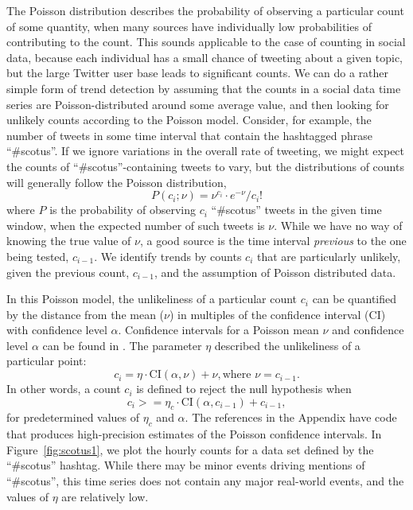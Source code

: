 \documentclass{article}
\begin{document}
The Poisson distribution describes the probability of observing a particular
count of some quantity, when many sources have individually low probabilities
of contributing to the count. This sounds applicable to the case of counting in
social data, because each individual has a small chance of tweeting about a
given topic, but the large Twitter user base leads to significant counts. We
can do a rather simple form of trend detection by assuming that the counts in a
social data time series are Poisson-distributed around some average value, and
then looking for unlikely counts according to the Poisson model. Consider, for example,
the number of tweets in some time interval that contain the hashtagged phrase ``\#scotus''.
If we ignore variations in the overall rate of tweeting, we might expect the
counts of ``\#scotus''-containing tweets to vary, but the distributions of counts
will generally follow the Poisson distribution,
\begin{equation}
    P(c_i;\nu) = \nu^{c_i}\cdot e^{-\nu} / c_i!
\end{equation}
where $P$ is the probability of observing $c_i$ ``\#scotus'' tweets in the given time
window, when the expected number of such tweets is $\nu$. While we have no way of
knowing the true value of $\nu$, a good source is the time interval \textit{previous} to the
one being tested, $c_{i-1}$. We identify trends by counts $c_i$ that are particularly
unlikely, given the previous count, $c_{i-1}$, and the assumption of Poisson
distributed data. 

In this Poisson model, the unlikeliness of a particular count $c_i$ can be
quantified by the distance from the mean ($\nu$) in multiples of the confidence 
interval (CI) with confidence level $\alpha$. Confidence intervals for a Poisson mean $\nu$ and
confidence level $\alpha$ can be found in \cite{George:2012}. 
The parameter $\eta$ described the unlikeliness of a particular point:
\begin{equation}
    c_i = \eta \cdot \textrm{CI}(\alpha, \nu) + \nu, \textrm{where } \nu = c_{i-1}.
\end{equation}
In other words, a count $c_i$ is defined to
reject the null hypothesis when
\begin{equation}
    c_i >= \eta_c \cdot \textrm{CI}(\alpha, c_{i-1}) + c_{i-1},
\end{equation}
for predetermined values of $\eta_c$ and $\alpha$. 
The references in
the Appendix have code that produces high-precision estimates of the
Poisson confidence intervals. In Figure~\ref{fig:scotus1}, we plot the hourly counts for a
data set defined by the ``\#scotus'' hashtag. While there may be minor events
driving mentions of ``\#scotus'', this time series does not contain any major
real-world events, and the values of $\eta$ are relatively low.
\end{document}

